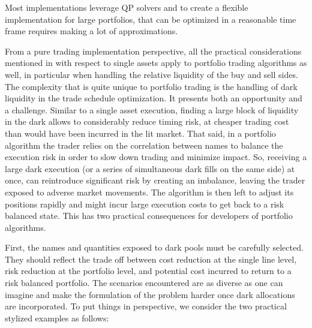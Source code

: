Most implementations leverage QP solvers and to create a flexible implementation for large portfolios, that can be optimized in a reasonable time frame requires making a lot of approximations.


From a pure trading implementation perspective, all the practical considerations mentioned in with respect to single assets apply to portfolio trading algorithms as well, in particular when handling the relative liquidity of the buy and sell sides. The complexity that is quite unique to portfolio trading is the handling of dark liquidity in the trade schedule optimization. It presents both an opportunity and a challenge. Similar to a single asset execution, finding a large block of liquidity in the dark allows to considerably reduce timing risk, at cheaper trading cost than would have been incurred in the lit market. That said, in a portfolio algorithm the trader relies on the correlation between names to balance the execution risk in order to slow down trading and minimize impact. So, receiving a large dark execution (or a series of simultaneous dark fills on the same side) at once, can reintroduce significant risk by creating an imbalance, leaving the trader exposed to adverse market movements. The algorithm is then left to adjust its positions rapidly and might incur large execution costs to get back to a risk balanced state. This has two practical consequences for developers of portfolio algorithms. 


First, the names and quantities exposed to dark pools must be carefully selected. They should reflect the trade off between cost reduction at the single line level, risk reduction at the portfolio level, and potential cost incurred to return to a risk balanced portfolio. The scenarios encountered are as diverse as one can imagine and make the formulation of the problem harder once dark allocations are incorporated. To put things in perspective, we consider the two practical stylized examples as follows:


